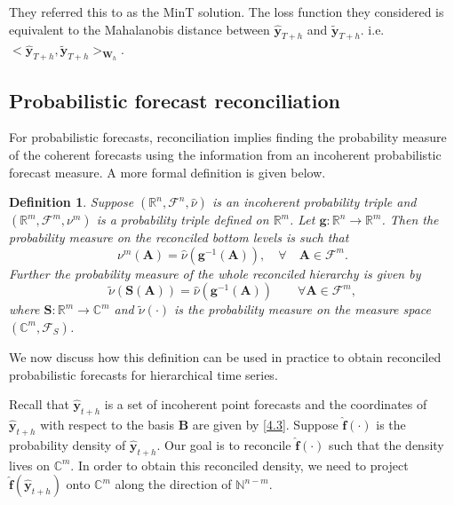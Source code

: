 \documentclass[a4paper, 11pt]{article}
\newtheorem{definition}{Definition}[section]
\begin{document}
They referred this to as the MinT solution. The loss function they considered is equivalent to the Mahalanobis distance between $\hat{\bm{y}}_{T+h}$ and $\tilde{\bm{y}}_{T+h}$. i.e. $<\hat{\bm{y}}_{T+h}, \tilde{\bm{y}}_{T+h}>_{\bm{W}_h}$.

\subsection{Probabilistic forecast reconciliation}

For probabilistic forecasts, reconciliation implies finding the probability measure of the coherent forecasts using the information from an incoherent probabilistic forecast measure. A more formal definition is given below.

\begin{definition} \label{def:reconprob}
  Suppose $(\mathbb{R}^n, \mathscr{F}^n, \hat{\nu})$ is an incoherent probability triple and $(\mathbb{R}^m, \mathscr{F}^m, \nu^m)$ is a probability triple defined on $\mathbb{R}^m$. Let $\bm{g}:\mathbb{R}^n \rightarrow \mathbb{R}^m $. Then the probability measure on the reconciled bottom levels is such that
  \begin{equation}
  \nu^m(\bm{A}) = \hat{\nu}(\bm{g}^{-1}(\bm{A})), \quad \forall \quad \bm{A} \in \mathscr{F}^m.
  \end{equation}
  Further the probability measure of the whole reconciled hierarchy is given by
  \begin{equation}
  \tilde{\nu}(\bm{S}(\bm{A})) = \hat{\nu}(\bm{g}^{-1}(\bm{A})) \qquad \forall \bm{A} \in \mathscr{F}^m,
  \end{equation}
  where $\bm{S}:\mathbb{R}^m \rightarrow \mathbb{C}^m$ and $\tilde{\nu}(\cdot)$ is the probability measure on the measure space $(\mathbb{C}^m, \mathscr{F}_S)$.
\end{definition}

We now discuss how this definition can be used in practice to obtain reconciled probabilistic forecasts for hierarchical time series.

Recall that $\hat{\bm{y}}_{t+h}$ is a set of incoherent point forecasts and the coordinates of $\hat{\bm{y}}_{t+h}$ with respect to the basis $\bm{B}$ are given by \eqref{4.3}. Suppose $\hat{\bm{f}}(\cdot)$ is the probability density of $\hat{\bm{y}}_{t+h}$. Our goal is to reconcile $\hat{\bm{f}}(\cdot)$ such that the density lives on $\mathbb{C}^m$. In order to obtain this reconciled density, we need to project $\hat{\bm{f}}(\hat{\bm{y}}_{t+h})$ onto $\mathbb{C}^m$ along the direction of $\mathbb{N}^{n-m}$.
\end{document}
